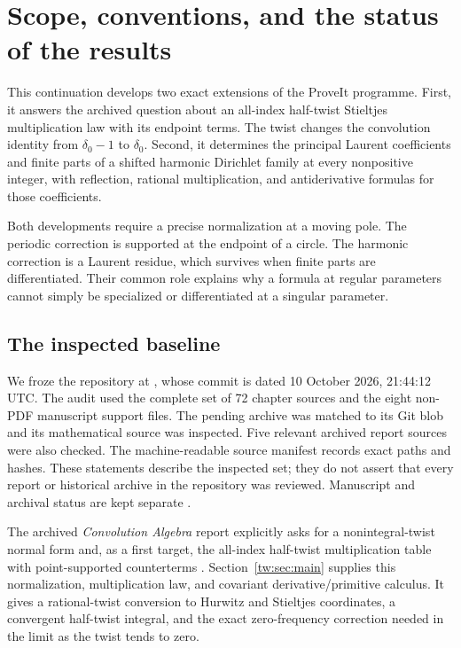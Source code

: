 \section{Scope, conventions, and the status of the results}
\label{scope:sec}

This continuation develops two exact extensions of the ProveIt programme.
First, it answers the archived question about an all-index half-twist
Stieltjes multiplication law with its endpoint terms. The twist changes
the convolution identity from \(\delta_0-1\) to \(\delta_0\).
Second, it determines the principal Laurent coefficients and finite
parts of a shifted harmonic Dirichlet family at every nonpositive
integer, with reflection, rational multiplication, and antiderivative
formulas for those coefficients.

Both developments require a precise normalization at a moving pole.
The periodic correction is supported at the endpoint of a circle.
The harmonic correction is a Laurent residue, which survives when
finite parts are differentiated. Their common role explains why a
formula at regular parameters cannot simply be specialized or
differentiated at a singular parameter.

\subsection{The inspected baseline}

We froze the repository at \pinned, whose commit is dated
10 October 2026, 21:44:12 UTC. The audit used the complete set of
72 chapter sources and the eight non-PDF manuscript support files.
The pending archive
was matched to its Git blob and its mathematical source was inspected.
Five relevant archived report sources were also checked.
The machine-readable source manifest records exact paths and hashes.
These statements describe the inspected set; they do not assert that
every report or historical archive in the repository was reviewed.
Manuscript and archival status are kept separate
\cite{RepoManuscript,RepoIncoming}.

The archived \emph{Convolution Algebra} report explicitly asks for a
nonintegral-twist normal form and, as a first target, the all-index
half-twist multiplication table with point-supported counterterms
\cite[final research section]{RepoConvolutionAlgebra}.
Section~\ref{tw:sec:main} supplies this normalization, multiplication
law, and covariant derivative/primitive calculus. It gives a
rational-twist conversion to Hurwitz and Stieltjes coordinates, a
convergent half-twist integral, and the exact zero-frequency correction
needed in the limit as the twist tends to zero.

